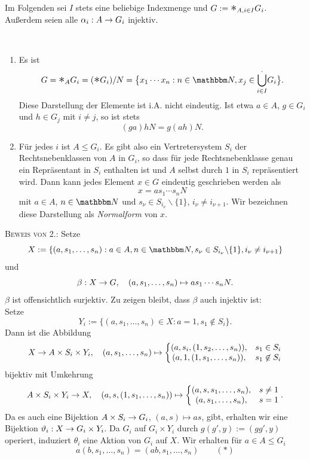\documentclass[a4paper, 12pt, twoside]{article}
\begin{document}
Im Folgenden sei $I$ stets eine beliebige Indexmenge und
$G:=\text{\Large$*$}_{A,i\in I} G_i$. Außerdem seien alle
$\alpha_i:A\rightarrow G_i$ injektiv.

\DB\label{bem_NF} \
\begin{enumerate}
\item Es ist
\[
G = \AST_A G_i = (\AST G_i)/N
=\bigl\{x_1\cdots x_n : n\in\NN, x_j\in\BCUP{.}{i\in I} G_i \bigr\}.
\]
Diese Darstellung der Elemente ist i.A. nicht eindeutig.
Ist etwa $a\in A$, $g\in G_i$ und $h\in G_j$ mit $i\neq j$, so
ist stets
\[
(ga)hN = g(ah)N.
\]
\item Für jedes $i$ ist $A\leq G_i$. Es gibt also ein Vertretersystem
$S_i$ der Rechtsnebenklassen von $A$ in $G_i$, so
dass für jede Rechtsnebenklasse genau ein Repräsentant
in $S_i$ enthalten ist und $A$ selbst durch $1$ in $S_i$ repräsentiert
wird.
Dann kann jedes Element $x\in G$ eindeutig geschrieben werden
als
\[
x = as_1\cdots s_n N
\]
mit $a\in A$, $n\in\NN$ und $s_{\nu}\in S_{i_{\nu}}\backslash\{1\}$,
$i_{\nu}\neq i_{\nu+1}$.
Wir bezeichnen diese Darstellung als \emph{Normalform} von $x$.
\end{enumerate}
\textsc{Beweis von 2.:}
Setze
\[
X :=
\{ (a,s_1,\ldots,s_n): a\in A, n\in\NN,
s_{\nu}\in S_{i_{\nu}}\backslash\{1\},
i_{\nu}\neq i_{\nu+1} \}
\]
und
\[
\beta:X\rightarrow G,\quad (a,s_1,\ldots,s_n)\mapsto a s_1\cdots s_n N.
\]
$\beta$ ist offensichtlich surjektiv. Zu zeigen bleibt,
dass $\beta$ auch injektiv ist:\\
Setze
\[
Y_i :=
\{ (a,s_1,\ldots,s_n)\in X : a=1, s_1\not\in S_i \}.
\]
Dann ist die Abbildung
\[
X\rightarrow A\times S_i\times Y_i,\quad
(a,s_1,\ldots,s_n)\mapsto \left\{
\begin{matrix}
(a,s_i,(1,s_2,\ldots,s_n)), & s_1\in S_i \\
(a,1,(1,s_1,\ldots,s_n)), & s_1\not\in S_i
\end{matrix}
\right.
\]
bijektiv mit Umkehrung
\[
A\times S_i\times Y_i \rightarrow X,\quad
(a,s,(1,s_1,\ldots,s_n))\mapsto \left\{
\begin{matrix}
(a,s,s_1,\ldots,s_n), & s \neq 1 \\
(a,s_1,\ldots,s_n), & s = 1
\end{matrix}
\right..
\]
Da es auch eine Bijektion
$A\times S_i \rightarrow G_i$, $(a,s)\mapsto as$, gibt,
erhalten wir eine Bijektion
$\vartheta_i:X\rightarrow G_i\times Y_i$.
Da $G_i$ auf $G_i\times Y_i$ durch $g(g',y):=(gg',y)$ operiert,
induziert $\theta_i$ eine Aktion von $G_i$ auf $X$.
Wir erhalten für $a\in A\leq G_i$
\[
a(b,s_1,\ldots,s_n) = (ab,s_1,\ldots,s_n)\qquad (*)
\]
\end{document}
